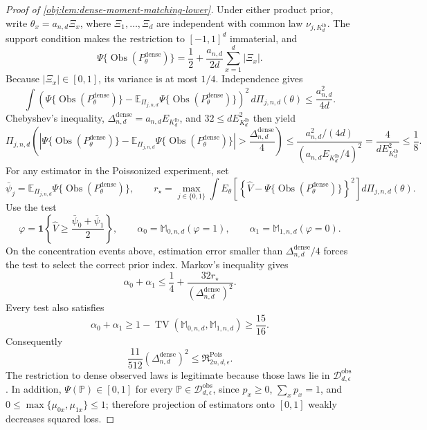 \documentclass[11pt]{article}
\begin{document}
\begin{proof}[Proof of \cref{obj:lem:dense-moment-matching-lower}]
Under either product prior, write \(\theta_x=a_{n,d}\Xi_x\), where \(\Xi_1,\ldots,\Xi_d\) are independent with common law \(\nu_{j,K_d^{\mathrm{lb}}}\). The support condition makes the restriction to \([-1,1]^d\) immaterial, and
\[
\Psi\{\operatorname{Obs}(P_\theta^{\mathrm{dense}})\}
=
\frac12+\frac{a_{n,d}}{2d}\sum_{x=1}^d|\Xi_x|.
\]
Because \(|\Xi_x|\in[0,1]\), its variance is at most \(1/4\). Independence gives
\[
\int
\left(\Psi\{\operatorname{Obs}(P_\theta^{\mathrm{dense}})\}
-\mathbb E_{\Pi_{j,n,d}}\Psi\{\operatorname{Obs}(P_\theta^{\mathrm{dense}})\}\right)^2
\,d\Pi_{j,n,d}(\theta)
\le
\frac{a_{n,d}^2}{4d}.
\]
Chebyshev's inequality, \(\Delta_{n,d}^{\mathrm{dense}}=a_{n,d}E_{K_d^{\mathrm{lb}}}\), and \(32\le dE_{K_d^{\mathrm{lb}}}^2\) then yield
\[
\Pi_{j,n,d}\left(
\left|\Psi\{\operatorname{Obs}(P_\theta^{\mathrm{dense}})\}
-\mathbb E_{\Pi_{j,n,d}}\Psi\{\operatorname{Obs}(P_\theta^{\mathrm{dense}})\}\right|
>
\frac{\Delta_{n,d}^{\mathrm{dense}}}{4}
\right)
\le
\frac{a_{n,d}^2/(4d)}
{(a_{n,d}E_{K_d^{\mathrm{lb}}}/4)^2}
=
\frac4{dE_{K_d^{\mathrm{lb}}}^2}
\le
\frac18.
\]
For any estimator in the Poissonized experiment, set
\[
\bar\psi_j
=
\mathbb E_{\Pi_{j,n,d}}
\Psi\{\operatorname{Obs}(P_\theta^{\mathrm{dense}})\},
\qquad
r_\star
=
\max_{j\in\{0,1\}}
\int E_\theta\!\left[
\left\{\widehat V-\Psi\{\operatorname{Obs}(P_\theta^{\mathrm{dense}})\}\right\}^2
\right]d\Pi_{j,n,d}(\theta).
\]
Use the test
\[
\varphi=\mathbf 1\!\left\{\widehat V\ge\frac{\bar\psi_0+\bar\psi_1}{2}\right\},
\qquad
\alpha_0=\mathbb M_{0,n,d}(\varphi=1),
\qquad
\alpha_1=\mathbb M_{1,n,d}(\varphi=0).
\]
On the concentration events above, estimation error smaller than \(\Delta_{n,d}^{\mathrm{dense}}/4\) forces the test to select the correct prior index. Markov's inequality gives
\[
\alpha_0+\alpha_1
\le
\frac14+\frac{32r_\star}{(\Delta_{n,d}^{\mathrm{dense}})^2}.
\]
Every test also satisfies
\[
\alpha_0+\alpha_1
\ge
1-\operatorname{TV}(\mathbb M_{0,n,d},\mathbb M_{1,n,d})
\ge
\frac{15}{16}.
\]
Consequently
\[
\frac{11}{512}(\Delta_{n,d}^{\mathrm{dense}})^2
\le
\mathfrak R^{\mathrm{Pois}}_{2n,d,\epsilon}.
\]
The restriction to dense observed laws is legitimate because those laws lie in \(\mathcal D_{d,\epsilon}^{\mathrm{obs}}\). In addition, \(\Psi(\mathbb P)\in[0,1]\) for every \(\mathbb P\in\mathcal D_{d,\epsilon}^{\mathrm{obs}}\), since \(p_x\ge0\), \(\sum_xp_x=1\), and \(0\le\max\{\mu_{0x},\mu_{1x}\}\le1\); therefore projection of estimators onto \([0,1]\) weakly decreases squared loss.


\end{proof}
\end{document}
